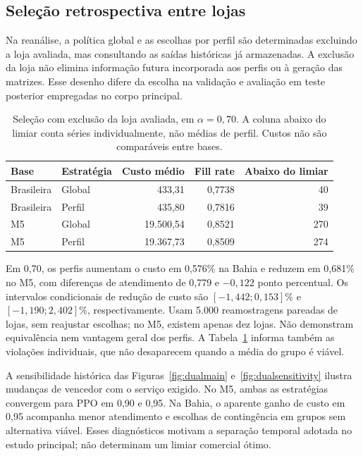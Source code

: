 \subsection{Seleção retrospectiva entre lojas}
Na reanálise, a política global e as escolhas por perfil são determinadas excluindo a loja avaliada, mas consultando as saídas históricas já armazenadas. A exclusão da loja não elimina informação futura incorporada aos perfis ou à geração das matrizes. Esse desenho difere da escolha na validação e avaliação em teste posterior empregadas no corpo principal.

\begin{table}[htbp]
\centering\small
\caption{Seleção com exclusão da loja avaliada, em $\alpha=0{,}70$. A coluna abaixo do limiar conta séries individualmente, não médias de perfil. Custos não são comparáveis entre bases.}\label{tab:strategies}
\begin{tabular}{llrrr}
\toprule
Base & Estratégia & Custo médio & Fill rate & Abaixo do limiar\\
\midrule
Brasileira & Global & 433,31 & 0,7738 & 40\\
Brasileira & Perfil & 435,80 & 0,7816 & 39\\
M5 & Global & 19.500,54 & 0,8521 & 270\\
M5 & Perfil & 19.367,73 & 0,8509 & 274\\
\bottomrule
\end{tabular}
\end{table}

Em 0,70, os perfis aumentam o custo em 0,576\% na Bahia e reduzem em 0,681\% no M5, com diferenças de atendimento de 0,779 e $-0{,}122$ ponto percentual. Os intervalos condicionais de redução de custo são $[-1{,}442;0{,}153]\%$ e $[-1{,}190;2{,}402]\%$, respectivamente. Usam 5.000 reamostragens pareadas de lojas, sem reajustar escolhas; no M5, existem apenas dez lojas. Não demonstram equivalência nem vantagem geral dos perfis. A Tabela~\ref{tab:strategies} informa também as violações individuais, que não desaparecem quando a média do grupo é viável.

A sensibilidade histórica das Figuras~\ref{fig:dualmain} e~\ref{fig:dualsensitivity} ilustra mudanças de vencedor com o serviço exigido. No M5, ambas as estratégias convergem para PPO em 0,90 e 0,95. Na Bahia, o aparente ganho de custo em 0,95 acompanha menor atendimento e escolhas de contingência em grupos sem alternativa viável. Esses diagnósticos motivam a separação temporal adotada no estudo principal; não determinam um limiar comercial ótimo.

